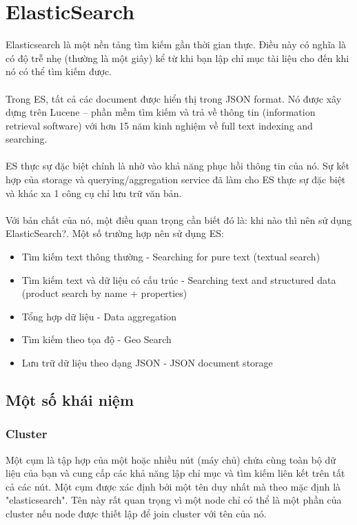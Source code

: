 \documentclass[a4paper,12pt]{report}
\begin{document}
\section*{ElasticSearch}
Elasticsearch là một nền tảng tìm kiếm gần thời gian thực. Điều này có nghĩa là có độ trễ nhẹ (thường là một giây) kể từ khi bạn lập chỉ mục tài liệu cho đến khi nó có thể tìm kiếm được. \\ \\
Trong ES, tất cả các document được hiển thị trong JSON format. Nó được xây dựng trên Lucene – phần mềm tìm kiếm và trả về thông tin  (information retrieval software) với hơn 15 năm kinh nghiệm về full text indexing and searching. \\ \\
ES thực sự đặc biệt chính là nhờ vào khả năng phục hồi thông tin của nó. Sự kết hợp của storage và querying/aggregation service đã làm cho ES thực sự đặc biệt và khác xa 1 công cụ chỉ lưu trữ văn bản. \\ \\
Với bản chất của nó, một điều quan trọng cần biết đó là: khi nào thì nên sử dụng ElasticSearch?. Một số trường hợp nên sử dụng ES:
\begin{itemize}
\item Tìm kiếm text thông thường - Searching for pure text (textual search)
\item Tìm kiếm text và dữ liệu có cấu trúc - Searching text and structured data (product search by name + properties)
\item Tổng hợp dữ liệu - Data aggregation
\item Tìm kiếm theo tọa độ - Geo Search
\item Lưu trữ dữ liệu theo dạng JSON - JSON document storage
\end{itemize}
\subsection*{Một số khái niệm}
\subsubsection*{Cluster}
Một cụm là tập hợp của một hoặc nhiều nút (máy chủ) chứa cùng toàn bộ dữ liệu của bạn và cung cấp các khả năng lập chỉ mục và tìm kiếm liên kết trên tất cả các nút. Một cụm được xác định bởi một tên duy nhất mà theo mặc định là "elasticsearch". Tên này rất quan trọng vì một node chỉ có thể là một phần của cluster nếu node được thiết lập để join cluster với tên của nó.
\end{document}
